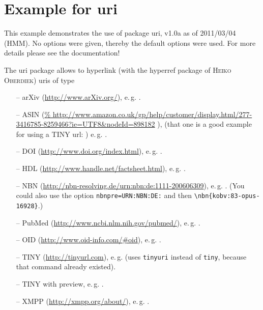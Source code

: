 \documentclass{article}
\begin{document}

\section*{Example for uri}

This example demonstrates the use of package\newline
\textsf{uri}, v1.0a as of 2011/03/04 (HMM).\newline
No options were given, thereby the default options were used.\newline
For more details please see the documentation!\newline

\bigskip

The \textsf{uri} package allows to hyperlink (with the \textsf{hyperref} package
of \textsc{Heiko Oberdiek}) uris of type
\begin{itemize}
\item[--] arXiv (\url{http://www.arXiv.org/}), e.\,g. .

\item[--] ASIN \newline
(\url{%
http://www.amazon.co.uk/gp/help/customer/display.html/277-3416785-8259466?ie=UTF8&nodeId=898182}%
), \newline
(that one is a good example for using a TINY url: )\newline
  e.\,g. .

\item[--] DOI (\url{http://www.doi.org/index.html}), e.\,g. .

\item[--] HDL (\url{http://www.handle.net/factsheet.html}), e.\,g. .

\item[--] NBN (\url{http://nbn-resolving.de/urn:nbn:de:1111-200606309}), \newline
  e.\,g. . (You could also use the option
  \texttt{nbnpre=URN:NBN:DE:} and then \texttt{\textbackslash nbn\{kobv:83-opus-16928\}}.)

\item[--] PubMed (\url{http://www.ncbi.nlm.nih.gov/pubmed/}), \newline
  e.\,g. .

\item[--] OID (\url{http://www.oid-info.com/#oid}), e.\,g. .

\item[--] TINY (\url{http://tinyurl.com}), e.\,g.  \newline
  (uses \texttt{tinyuri} instead of \texttt{tiny}, because that command already existed).

\item[--] TINY with preview, e.\,g. .

\item[--] XMPP (\url{http://xmpp.org/about/}), e.\,g. .
\end{itemize}
\end{document}
